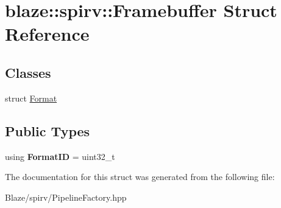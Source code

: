 \hypertarget{structblaze_1_1spirv_1_1Framebuffer}{}\section{blaze\+:\+:spirv\+:\+:Framebuffer Struct Reference}
\label{structblaze_1_1spirv_1_1Framebuffer}
\subsection*{Classes}
\begin{DoxyCompactItemize}
\item 
struct \hyperlink{structblaze_1_1spirv_1_1Framebuffer_1_1Format}{Format}
\end{DoxyCompactItemize}
\subsection*{Public Types}
\begin{DoxyCompactItemize}
\item 
\mbox{\label{structblaze_1_1spirv_1_1Framebuffer_a58e3008a8d8bf821270ff320fbfe9743}} 
using {\bfseries Format\+ID} = uint32\+\_\+t
\end{DoxyCompactItemize}


The documentation for this struct was generated from the following file\+:\begin{DoxyCompactItemize}
\item 
Blaze/spirv/Pipeline\+Factory.\+hpp\end{DoxyCompactItemize}
